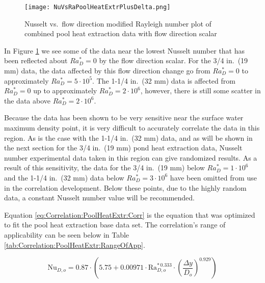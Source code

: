 \begin{figure}
	\centering
	\texttt{[image: NuVsRaPoolHeatExtrPlusDelta.png]}
	\caption{Nusselt vs.\ flow direction modified Rayleigh number plot of combined pool heat extraction data with flow direction scalar}
	\label{fig:Correlation:PoolHeatExtr:NuVsRaPlusDelta}
\end{figure}

In Figure \ref{fig:Correlation:PoolHeatExtr:NuVsRaPlusDelta} we see some of the data near the lowest Nusselt number that has been reflected about $Ra_D^*=0$ by the flow direction scalar. For the 3/4 in.\ (19 mm) data, the data affected by this flow direction change go from $Ra_D^*=0$ to approximately $Ra_D^*=5\cdot10^5$. The 1-1/4 in.\ (32 mm) data is affected from $Ra_D^*=0$ up to approximately $Ra_D^*=2\cdot10^6$, however, there is still some scatter in the data above $Ra_D^*=2\cdot10^6$.

Because the data has been shown to be very sensitive near the surface water maximum density point, it is very difficult to accurately correlate the data in this region. As is the case with the 1-1/4 in.\ (32 mm) data, and as will be shown in the next section for the 3/4 in.\ (19 mm) pond heat extraction data, Nusselt number experimental data taken in this region can give randomized results. As a result of this sensitivity, the data for the 3/4 in.\ (19 mm) below $Ra_D^*=1\cdot10^6$ and the 1-1/4 in.\ (32 mm) data below $Ra_D^*=3\cdot10^6$ have been omitted from use in the correlation development. Below these points, due to the highly random data, a constant Nusselt number value will be recommended.

Equation \ref{eq:Correlation:PoolHeatExtr:Corr} is the equation that was optimized to fit the pool heat extraction base data set. The correlation's range of applicability can be seen below in Table \ref{tab:Correlation:PoolHeatExtr:RangeOfApp}.

\begin{equation}
	\mbox{Nu}_{D,o} = 0.87 \cdot \left(5.75 + 0.00971 \cdot \mbox{Ra}_{D,o}^{* \, 0.333} \cdot \left(\frac{\Delta y}{D_o}\right)^{0.929}\right)
	\label{eq:Correlation:PoolHeatExtr:Corr}
\end{equation}


